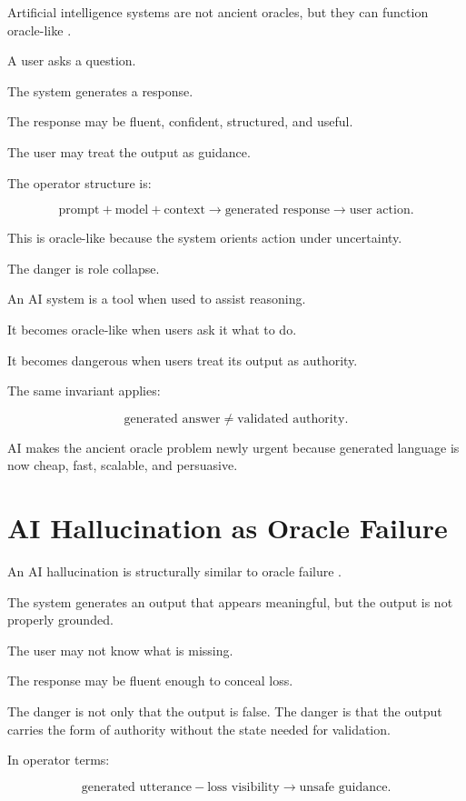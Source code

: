 \documentclass[11pt]{book}
\begin{document}
Artificial intelligence systems are not ancient oracles, but they can function oracle-like \cite{Bender2021StochasticParrots,Weidinger2021EthicalSocialRisks}.

A user asks a question.

The system generates a response.

The response may be fluent, confident, structured, and useful.

The user may treat the output as guidance.

The operator structure is:

\[
\text{prompt}
+
\text{model}
+
\text{context}
\rightarrow
\text{generated response}
\rightarrow
\text{user action}.
\]

This is oracle-like because the system orients action under uncertainty.

The danger is role collapse.

An AI system is a tool when used to assist reasoning.

It becomes oracle-like when users ask it what to do.

It becomes dangerous when users treat its output as authority.

The same invariant applies:

\[
\text{generated answer} \neq \text{validated authority}.
\]

AI makes the ancient oracle problem newly urgent because generated language is now cheap, fast, scalable, and persuasive.

\section{AI Hallucination as Oracle Failure}

An AI hallucination is structurally similar to oracle failure \cite{Bender2021StochasticParrots,Weidinger2021EthicalSocialRisks,Cameron2026IPRP}.

The system generates an output that appears meaningful, but the output is not properly grounded.

The user may not know what is missing.

The response may be fluent enough to conceal loss.

The danger is not only that the output is false. The danger is that the output carries the form of authority without the state needed for validation.

In operator terms:

\[
\text{generated utterance}
-
\text{loss visibility}
\rightarrow
\text{unsafe guidance}.
\]
\end{document}
